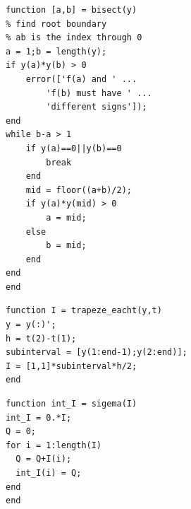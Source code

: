 \documentclass{article}
\begin{document}
\begin{flushleft}
\begin{enumerate}
\begin{framed}
\begin{multicols}{2}
\begin{verbatim}
function [a,b] = bisect(y)
% find root boundary
% ab is the index through 0
a = 1;b = length(y);
if y(a)*y(b) > 0 
    error(['f(a) and ' ...
        'f(b) must have ' ...
        'different signs']);
end
while b-a > 1
    if y(a)==0||y(b)==0
        break
    end
    mid = floor((a+b)/2);
    if y(a)*y(mid) > 0
        a = mid;
    else
        b = mid;
    end
end
end
\end{verbatim}
\columnbreak
\begin{verbatim}
function I = trapeze_eacht(y,t)
y = y(:)';
h = t(2)-t(1);
subinterval = [y(1:end-1);y(2:end)];
I = [1,1]*subinterval*h/2;
end
\end{verbatim}

\begin{verbatim}
function int_I = sigema(I)
int_I = 0.*I;
Q = 0;
for i = 1:length(I)
  Q = Q+I(i);
  int_I(i) = Q;
end
end
\end{verbatim}
\end{multicols}

\newpage



\end{framed}
\end{enumerate}
\end{flushleft}
\end{document}
